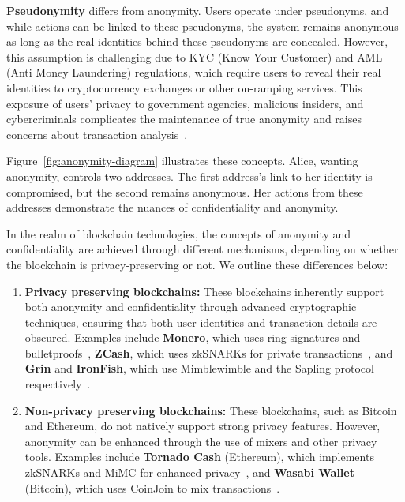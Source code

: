\documentclass[pdftex,twocolumn,epjc3]{svjour3}
\begin{document}
\begin{sloppypar}
\textbf{Pseudonymity} differs from anonymity. Users operate under pseudonyms, and while actions can be linked to these pseudonyms, the system remains anonymous as long as the real identities behind these pseudonyms are concealed. However, this assumption is challenging due to KYC (Know Your Customer) and AML (Anti Money Laundering) regulations, which require users to reveal their real identities to cryptocurrency exchanges or other on-ramping services. This exposure of users' privacy to government agencies, malicious insiders, and cybercriminals complicates the maintenance of true anonymity and raises concerns about transaction analysis~\cite{androulakiEvaluatingUserPrivacy2013, oberStructureAnonymityBitcoin2013}.

Figure~\ref{fig:anonymity-diagram} illustrates these concepts. Alice, wanting anonymity, controls two addresses. The first address's link to her identity is compromised, but the second remains anonymous. Her actions from these addresses demonstrate the nuances of confidentiality and anonymity.
\end{sloppypar}

In the realm of blockchain technologies, the concepts of anonymity and confidentiality are achieved through different mechanisms, depending on whether the blockchain is privacy-preserving or not. We outline these differences below:

\begin{sloppypar}
\begin{enumerate}
    \item \textbf{Privacy preserving blockchains:} These blockchains inherently support both anonymity and confidentiality through advanced cryptographic techniques, ensuring that both user identities and transaction details are obscured. Examples include \textbf{Monero}, which uses ring signatures and bulletproofs~\cite{vansaberhagenCryptoNote2013, noetherRingSignatureConfidential2015, bunzBulletproofsShortProofs2018}, \textbf{ZCash}, which uses zkSNARKs for private transactions~\cite{ben-sassonZerocashDecentralizedAnonymous2014}, and \textbf{Grin} and \textbf{IronFish}, which use Mimblewimble and the Sapling protocol respectively~\cite{jedusorMIMBLEWIMBLE2016,fuchsbauerAggregateCashSystems2019, hopwoodZcashSaplingProtocol2022, ironfishPrivateAnonymousEasy}.
    \item \textbf{Non-privacy preserving blockchains:} These blockchains, such as Bitcoin and Ethereum, do not natively support strong privacy features. However, anonymity can be enhanced through the use of mixers and other privacy tools. Examples include \textbf{Tornado Cash} (Ethereum), which implements zkSNARKs and MiMC for enhanced privacy~\cite{grothSizePairingbasedNoninteractive2016,pertsevTornadoCashPrivacy2019}, and \textbf{Wasabi Wallet} (Bitcoin), which uses CoinJoin to mix transactions~\cite{maxwellCoinJoinBitcoinPrivacy2013,wasabiwalletBitcoinPrivacyWallet}.
\end{enumerate}
\end{sloppypar}
\end{document}
